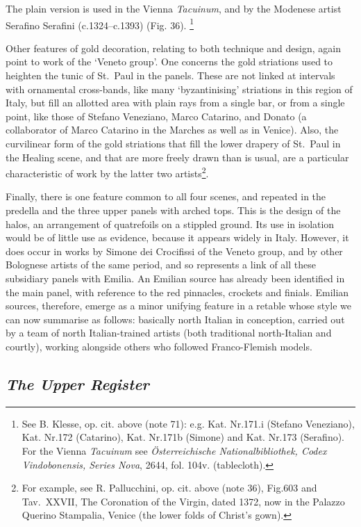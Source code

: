\documentclass[a4paper,12pt]{article}
\begin{document}
The plain version is used in the Vienna \textit{Tacuinum}, and by
the Modenese artist Serafino Serafini (c.1324--c.1393)
(Fig. 36).
\footnote{See B. Klesse, op. cit. above (note 71):
e.g. Kat. Nr.171.i (Stefano Veneziano), Kat. Nr.172 (Catarino),
Kat. Nr.171b (Simone) and Kat. Nr.173 (Serafino). For the Vienna
\textit{Tacuinum} see \textit{\"Osterreichische Nationalbibliothek,
Codex Vindobonensis, Series Nova}, 2644, fol. 104v. (tablecloth).}

Other features of gold decoration, relating to both technique and
design, again point to work of the `Veneto group'. One concerns the
gold striations used to heighten the tunic of St.~Paul in the
panels. These are not linked at intervals with ornamental cross-bands,
like many `byzantinising' striations in this region of Italy, but fill
an allotted area with plain rays from a single bar, or from a single
point, like those of Stefano Veneziano, Marco Catarino, and Donato (a
collaborator of Marco Catarino in the Marches as well as in
Venice). Also, the curvilinear form of the gold striations that fill
the lower drapery of St.~Paul in the Healing scene, and that are more
freely drawn than is usual, are a particular characteristic of work by
the latter two artists\footnote{For example, see R. Pallucchini,
op. cit. above (note 36), Fig.603 and Tav.~XXVII, The Coronation of the
Virgin, dated 1372, now in the Palazzo Querino Stampalia, Venice (the
lower folds of Christ's gown).}.

Finally, there is one feature common to all four scenes, and repeated
in the predella and the three upper panels with arched tops. This is
the design of the halos, an arrangement of quatrefoils on a stippled
ground.  Its use in isolation would be of little use as evidence,
because it appears widely in Italy. However, it does occur in works by
Simone dei Crocifissi of the Veneto group, and by other Bolognese
artists of the same period, and so represents a link of all these
subsidiary panels with Emilia. An Emilian source has already been
identified in the main panel, with reference to the red pinnacles,
crockets and finials. Emilian sources, therefore, emerge as a minor
unifying feature in a retable whose style we can now summarise as
follows: basically north Italian in conception, carried out by a team
of north Italian-trained artists (both traditional north-Italian and
courtly), working alongside others who followed Franco-Flemish models.


\subsection{\textit{The Upper Register}}
\end{document}
